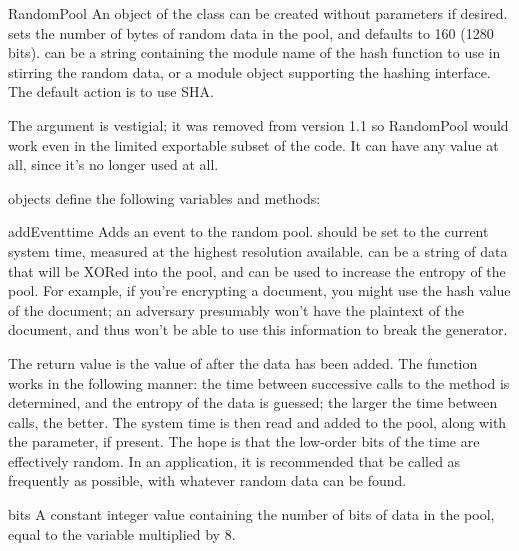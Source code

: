 \documentclass{howto}
\begin{document}
\begin{funcdesc}{RandomPool}{ }
An object of the  class can be created without
parameters if desired.   sets the number of bytes of
random data in the pool, and defaults to 160 (1280 bits). 
can be a string containing the module name of the hash function to use
in stirring the random data, or a module object supporting the hashing
interface.  The default action is to use SHA.

The  argument is vestigial; it was removed from version
1.1 so RandomPool would work even in the limited exportable subset of
the code.  It can have any value at all, since it's no longer used at
all.

\end{funcdesc}

 objects define the following variables and methods:

\begin{funcdesc}{addEvent}{time}
Adds an event to the random pool.   should be set to the
current system time, measured at the highest resolution available.
 can be a string of data that will be XORed into the pool,
and can be used to increase the entropy of the pool.  For example, if
you're encrypting a document, you might use the hash value of the
document; an adversary presumably won't have the plaintext of the
document, and thus won't be able to use this information to break the
generator.
\end{funcdesc}

The return value is the value of  after the data has
been added.  The function works in the following manner: the time
between successive calls to the  method is determined,
and the entropy of the data is guessed; the larger the time between
calls, the better.  The system time is then read and added to the pool,
along with the  parameter, if present.  The hope is that the
low-order bits of the time are effectively random.  In an application,
it is recommended that  be called as frequently as
possible, with whatever random data can be found.

\begin{datadesc}{bits}
A constant integer value containing the number of bits of data in
the pool, equal to the  variable multiplied by 8.
\end{datadesc}
\end{document}
